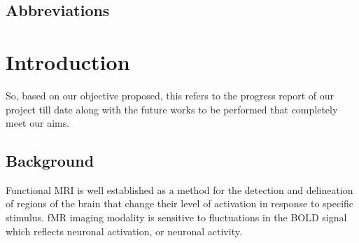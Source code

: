 \documentclass{article}
\begin{document}
\newpage

\thispagestyle{empty}
\listoffigures

\thispagestyle{empty}
\listoftables
\newpage


\begin{center}
  \section*{Abbreviations}
\end{center}

\begin{acronym}
\end{acronym}

\newpage
\vskip -10pt
\enlargethispage{\baselineskip}
\thispagestyle{empty}
\addcontentsline{}{}{}
\tableofcontents
\newpage

\clearpage
\setcounter{page}{1}

\section{Introduction}

So, based on our objective proposed, this refers to the progress
report of our project till date along with the future works to be
performed that completely meet our aims.

\subsection{Background}

Functional MRI is well established as a method for the detection and
delineation of regions of the brain that change their level of
activation in response to specific stimulus. fMR imaging modality
is sensitive to fluctuations in the BOLD signal which reflects
neuronal activation, or neuronal activity.
\end{document}

